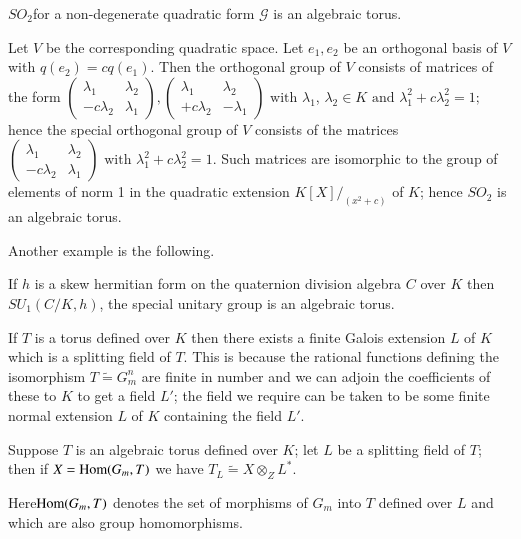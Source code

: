 \begin{exam}\label{chap3:exam3}
$SO_2$\pageoriginale for a non-degenerate quadratic form $\mathscr
  {G}$ is an algebraic torus. 

Let $V$ be the corresponding quadratic space. Let $e_1,e_2$ be an
orthogonal basis of $V$ with $q(e_2)=cq(e_1)$. Then the orthogonal
group of $V$ consists of matrices of the form		 
$
\begin{pmatrix}
\lambda_1 &\lambda_2\\
-c \lambda_2 & \lambda_1
\end{pmatrix},
\begin{pmatrix}
\lambda_1 &\lambda_2\\
+c \lambda_2 & -\lambda_1
\end{pmatrix} 
\text{ with  }\lambda_1$, $\lambda_2 \in K \text{ and } \lambda_1^2 + c
\lambda_2^2=1;$ hence the special orthogonal group of  $V$ consists of
the matrices 
$
\begin{pmatrix}
\lambda_1 &\lambda_2\\
-c \lambda_2 & \lambda_1
\end{pmatrix}
\text{ with } \lambda_1^2 +c \lambda_2^2=1
$.
Such matrices are isomorphic to the group of elements of norm 1 in
the quadratic extension $K[X]/_{(x^2+c)}$ of $K$; hence $SO_2$ is an
algebraic torus. 
\end{exam}

Another example is the following.

\begin{exam}\label{chap3:exam4}
If $h$ is a skew hermitian form on the quaternion division algebra $C$
over $K$ then $SU_1(C/K,h)$, the special unitary group is an algebraic
torus.  

If $T$ is a torus defined over $K$ then there exists a finite Galois
extension $L$ of $K$ which is a splitting field of $T$. This is
because the rational functions defining the isomorphism $T
\widetilde{=} G_m^n$ are finite in number and we can adjoin the
coefficients of these to $K$ to get a field $L'$; the field we
require can be taken to be some finite normal extension $L$ of $K$
containing the field $L'$. 
\end{exam}

\begin{thm}\label{chap3:thm1}
Suppose $T$ is an algebraic torus defined over $K$; let $L$ be a
splitting field of $T$; then if $X= \operatorname{Hom} (G_m,T)$ we have $T_L
\widetilde{=} X \otimes_Z L^*$.  

Here\pageoriginale $\operatorname{Hom} (G_m,T)$ denotes the set of morphisms of
$G_m$ into $T$ defined over $L$ and which are also group
homomorphisms. 
 \end{thm} 

